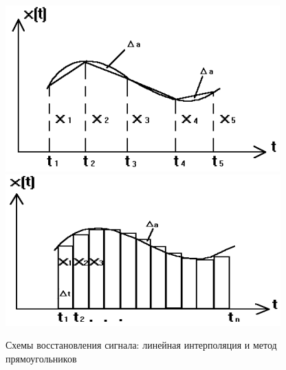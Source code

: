 	\begin{figure}[H]
		\centering
		\begin{minipage}[t]{0.48\linewidth}
			\centering
			\includegraphics[width=\linewidth, height=0.2\textheight]{img/03_04}
		\end{minipage}%
		\hfill
		\begin{minipage}[t]{0.48\linewidth}
			\centering
			\includegraphics[width=\linewidth, height=0.2\textheight]{img/03_05}
		\end{minipage}
		\small{Схемы восстановления сигнала: линейная интерполяция и метод прямоугольников}
		\label{fig:03_combined_2}
	\end{figure}
	
	\newpage
	
